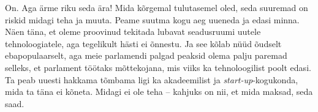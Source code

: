 
On. Aga ärme riku seda ära! Mida kõrgemal tulutasemel oled, seda suuremad on 
riskid midagi teha ja muuta. Peame suutma kogu aeg 
uueneda ja edasi minna. Näen täna, et oleme 
proovinud tekitada lubavat seadusruumi uutele tehnoloogiatele, aga tegelikult 
hästi ei õnnestu. Ja see kõlab nüüd õudselt ebapopulaarselt, aga meie parlamendi palgad 
peaksid olema palju paremad selleks, et parlament töötaks mõttekojana, 
mis viiks ka tehnoloogilist poolt edasi. Ta peab uuesti hakkama tõmbama ligi ka 
akadeemilist ja \emph{start-up}-kogukonda, mida ta täna ei 
kõneta. Midagi ei ole teha -- kahjuks on nii, et mida maksad, seda saad.